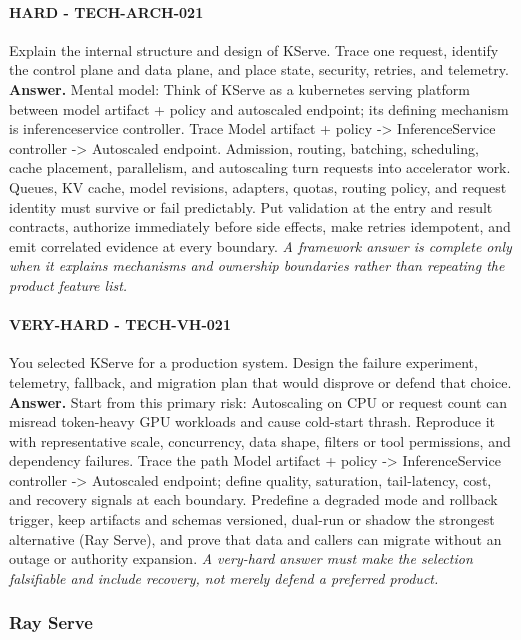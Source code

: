 \paragraph{HARD - TECH-ARCH-021} Explain the internal structure and design of KServe. Trace one request, identify the control plane and data plane, and place state, security, retries, and telemetry.
\textbf{Answer.} Mental model: Think of KServe as a kubernetes serving platform between model artifact + policy and autoscaled endpoint; its defining mechanism is inferenceservice controller. Trace Model artifact + policy -> InferenceService controller -> Autoscaled endpoint. Admission, routing, batching, scheduling, cache placement, parallelism, and autoscaling turn requests into accelerator work. Queues, KV cache, model revisions, adapters, quotas, routing policy, and request identity must survive or fail predictably. Put validation at the entry and result contracts, authorize immediately before side effects, make retries idempotent, and emit correlated evidence at every boundary.
\textit{A framework answer is complete only when it explains mechanisms and ownership boundaries rather than repeating the product feature list.}
\paragraph{VERY-HARD - TECH-VH-021} You selected KServe for a production system. Design the failure experiment, telemetry, fallback, and migration plan that would disprove or defend that choice.
\textbf{Answer.} Start from this primary risk: Autoscaling on CPU or request count can misread token-heavy GPU workloads and cause cold-start thrash. Reproduce it with representative scale, concurrency, data shape, filters or tool permissions, and dependency failures. Trace the path Model artifact + policy -> InferenceService controller -> Autoscaled endpoint; define quality, saturation, tail-latency, cost, and recovery signals at each boundary. Predefine a degraded mode and rollback trigger, keep artifacts and schemas versioned, dual-run or shadow the strongest alternative (Ray Serve), and prove that data and callers can migrate without an outage or authority expansion.
\textit{A very-hard answer must make the selection falsifiable and include recovery, not merely defend a preferred product.}
\subsubsection*{Ray Serve}
